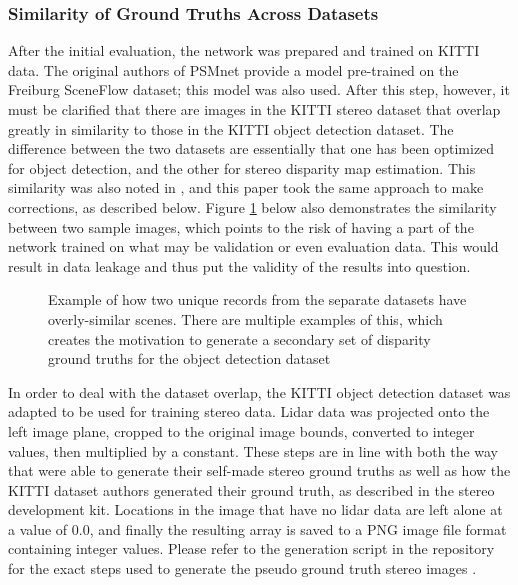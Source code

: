 \subsubsection{Similarity of Ground Truths Across Datasets}
\label{sect_datamod}
After the initial evaluation, the network was prepared and trained on KITTI data. The original authors of PSMnet provide a model pre-trained on the Freiburg SceneFlow dataset; this model was also used. After this step, however, it must be clarified that there are images in the KITTI stereo dataset that overlap greatly in similarity to those in the KITTI object detection dataset. The difference between the two datasets are essentially that one has been optimized for object detection, and the other for stereo disparity map estimation. This similarity was also noted in \cite{wang_pseudo-lidar_2019}, and this paper took the same approach to make corrections, as described below. Figure \ref{similarity_stereo_objdet} below also demonstrates the similarity between two sample images, which points to the risk of having a part of the network trained on what may be validation or even evaluation data. This would result in data leakage and thus put the validity of the results into question.

\begin{figure}[ht]
	\centering
	\caption{Example of how two unique records from the separate datasets have overly-similar scenes. There are multiple examples of this, which creates the motivation to generate a secondary set of disparity ground truths for the object detection dataset}
	\label{similarity_stereo_objdet}
\end{figure}

In order to deal with the dataset overlap, the KITTI object detection dataset was adapted to be used for training stereo data. Lidar data was projected onto the left image plane, cropped to the original image bounds, converted to integer values, then multiplied by a constant. These steps are in line with both the way that \cite{wang_pseudo-lidar_2019} were able to generate their self-made stereo ground truths as well as how the KITTI dataset authors generated their ground truth, as described in the stereo development kit. Locations in the image that have no lidar data are left alone at a value of 0.0, and finally the resulting array is saved to a PNG image file format containing integer values. Please refer to the generation script in the repository for the exact steps used to generate the pseudo ground truth stereo images \cite{gonzalez_smart3d_2019}.

